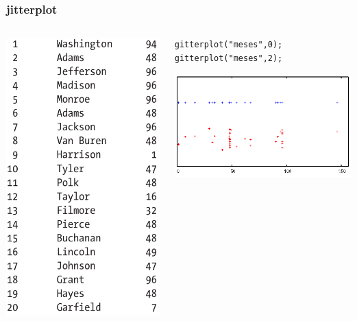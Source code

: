 \documentclass{beamer}
\begin{document}
\begin{frame}[fragile]
\frametitle{jitterplot}

\begin{columns}

\begin{column}{0.3\textwidth}
\includegraphics[scale=0.2]{jittertable}
\end{column}

\begin{column}{0.7\textwidth}
\begin{center}
\begin{lstlisting}
gitterplot("meses",0);
gitterplot("meses",2);
\end{lstlisting}
\end{center}
\includegraphics[scale=0.5]{jitterplot}


\end{column}
\end{columns}
\end{frame}
\end{document}
